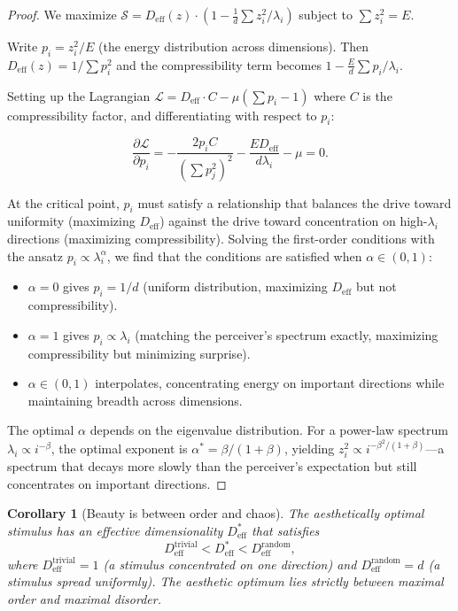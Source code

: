\documentclass[journal]{IEEEtran}
\newtheorem{corollary}[theorem]{Corollary}
\begin{document}
\begin{proof}
We maximize $\mathcal{S} = D_{\mathrm{eff}}(z) \cdot
(1 - \frac{1}{d}\sum z_i^2/\lambda_i)$ subject to
$\sum z_i^2 = E$.

Write $p_i = z_i^2 / E$ (the energy distribution across dimensions).
Then $D_{\mathrm{eff}}(z) = 1 / \sum p_i^2$ and the compressibility
term becomes $1 - \frac{E}{d}\sum p_i / \lambda_i$.

Setting up the Lagrangian $\mathcal{L} = D_{\mathrm{eff}} \cdot C
- \mu(\sum p_i - 1)$ where $C$ is the compressibility factor, and
differentiating with respect to $p_i$:

\begin{equation}
    \frac{\partial \mathcal{L}}{\partial p_i} =
    -\frac{2p_i C}{(\sum p_j^2)^2}
    - \frac{E D_{\mathrm{eff}}}{d \lambda_i}
    - \mu = 0.
\end{equation}

At the critical point, $p_i$ must satisfy a relationship that balances
the drive toward uniformity (maximizing $D_{\mathrm{eff}}$) against
the drive toward concentration on high-$\lambda_i$ directions
(maximizing compressibility).  Solving the first-order conditions
with the ansatz $p_i \propto \lambda_i^\alpha$, we find that the
conditions are satisfied when $\alpha \in (0,1)$:

\begin{itemize}
    \item $\alpha = 0$ gives $p_i = 1/d$ (uniform distribution,
    maximizing $D_{\mathrm{eff}}$ but not compressibility).
    \item $\alpha = 1$ gives $p_i \propto \lambda_i$ (matching the
    perceiver's spectrum exactly, maximizing compressibility but
    minimizing surprise).
    \item $\alpha \in (0,1)$ interpolates, concentrating energy on
    important directions while maintaining breadth across dimensions.
\end{itemize}

The optimal $\alpha$ depends on the eigenvalue distribution.  For
a power-law spectrum $\lambda_i \propto i^{-\beta}$, the optimal
exponent is $\alpha^* = \beta / (1 + \beta)$, yielding
$z_i^2 \propto i^{-\beta^2/(1+\beta)}$---a spectrum that decays
more slowly than the perceiver's expectation but still concentrates
on important directions.
\end{proof}

\begin{corollary}[Beauty is between order and chaos]
\label{cor:edge}
The aesthetically optimal stimulus has an effective dimensionality
$D_{\mathrm{eff}}^*$ that satisfies
\begin{equation}
    D_{\mathrm{eff}}^{\text{trivial}} < D_{\mathrm{eff}}^* <
    D_{\mathrm{eff}}^{\text{random}},
\end{equation}
where $D_{\mathrm{eff}}^{\text{trivial}} = 1$ (a stimulus concentrated
on one direction) and $D_{\mathrm{eff}}^{\text{random}} = d$
(a stimulus spread uniformly).  The aesthetic optimum lies strictly
between maximal order and maximal disorder.
\end{corollary}
\end{document}
